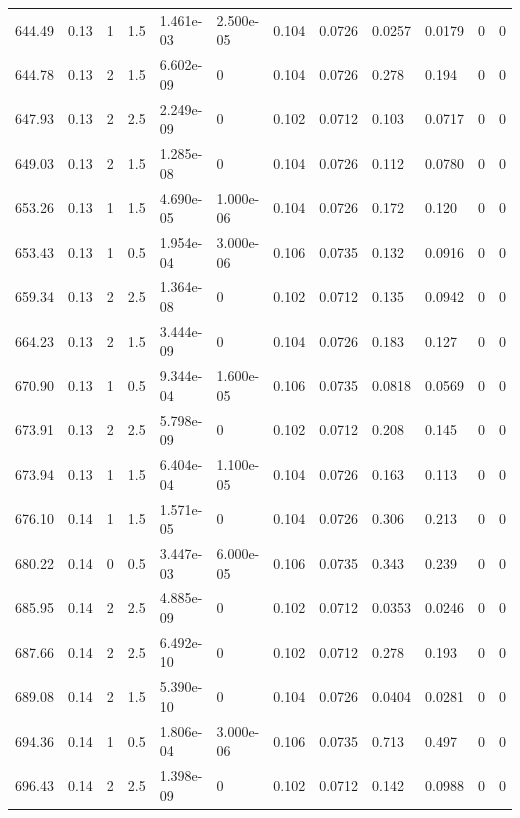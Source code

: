 \documentclass[preview]{standalone}
\begin{document}
{{{{{\begin{tabular}{L{1.2cm}C{1.2cm} C{0.3cm}C{0.5cm} C{1.4cm}C{1.4cm} C{1.4cm}C{1.4cm} C{1.6cm}C{1.6cm} C{1.6cm}C{1.6cm}}
  644.49  &  0.13  & 1     & 1.5 &  1.461e-03  & 2.500e-05  &  0.104&   0.0726& 0.0257 & 0.0179   &  0 & 0  \\ 
  644.78  &  0.13  & 2     & 1.5 &  6.602e-09  & 0  &  0.104&   0.0726& 0.278 & 0.194   &  0 & 0  \\ 
  647.93  &  0.13  & 2     & 2.5 &  2.249e-09  & 0  &  0.102&   0.0712& 0.103 & 0.0717   &  0 & 0  \\ 
  649.03  &  0.13  & 2     & 1.5 &  1.285e-08  & 0  &  0.104&   0.0726& 0.112 & 0.0780   &  0 & 0  \\ 
  653.26  &  0.13  & 1     & 1.5 &  4.690e-05  & 1.000e-06  &  0.104&   0.0726& 0.172 & 0.120   &  0 & 0  \\ 
  653.43  &  0.13  & 1     & 0.5 &  1.954e-04  & 3.000e-06  &  0.106&   0.0735& 0.132 & 0.0916   &  0 & 0  \\ 
  659.34  &  0.13  & 2     & 2.5 &  1.364e-08  & 0  &  0.102&   0.0712& 0.135 & 0.0942   &  0 & 0  \\ 
  664.23  &  0.13  & 2     & 1.5 &  3.444e-09  & 0  &  0.104&   0.0726& 0.183 & 0.127   &  0 & 0  \\ 
  670.90  &  0.13  & 1     & 0.5 &  9.344e-04  & 1.600e-05  &  0.106&   0.0735& 0.0818 & 0.0569   &  0 & 0  \\ 
  673.91  &  0.13  & 2     & 2.5 &  5.798e-09  & 0  &  0.102&   0.0712& 0.208 & 0.145   &  0 & 0  \\ 
  673.94  &  0.13  & 1     & 1.5 &  6.404e-04  & 1.100e-05  &  0.104&   0.0726& 0.163 & 0.113   &  0 & 0  \\ 
  676.10  &  0.14  & 1     & 1.5 &  1.571e-05  & 0  &  0.104&   0.0726& 0.306 & 0.213   &  0 & 0  \\ 
  680.22  &  0.14  & 0     & 0.5 &  3.447e-03  & 6.000e-05  &  0.106&   0.0735& 0.343 & 0.239   &  0 & 0  \\ 
  685.95  &  0.14  & 2     & 2.5 &  4.885e-09  & 0  &  0.102&   0.0712& 0.0353 & 0.0246   &  0 & 0  \\ 
  687.66  &  0.14  & 2     & 2.5 &  6.492e-10  & 0  &  0.102&   0.0712& 0.278 & 0.193   &  0 & 0  \\ 
  689.08  &  0.14  & 2     & 1.5 &  5.390e-10  & 0  &  0.104&   0.0726& 0.0404 & 0.0281   &  0 & 0  \\ 
  694.36  &  0.14  & 1     & 0.5 &  1.806e-04  & 3.000e-06  &  0.106&   0.0735& 0.713 & 0.497   &  0 & 0  \\ 
  696.43  &  0.14  & 2     & 2.5 &  1.398e-09  & 0  &  0.102&   0.0712& 0.142 & 0.0988   &  0 & 0  \\ 

\end{tabular}}}}}}
\end{document}
